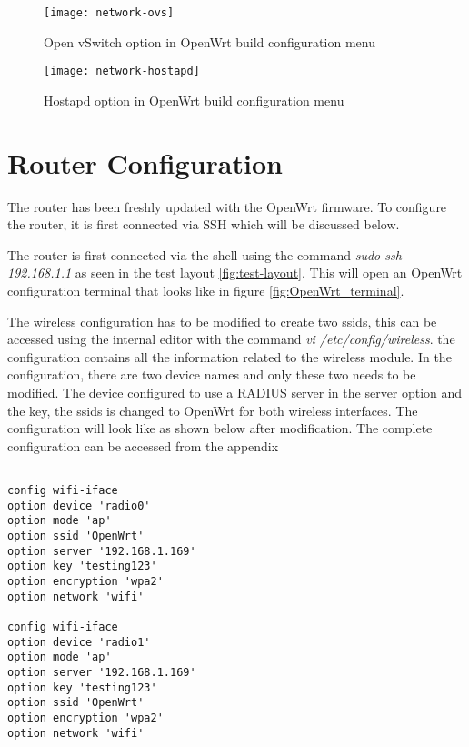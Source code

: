   \begin{figure}[H]
 	\centering
 	\texttt{[image: network-ovs]}
 	\caption {Open vSwitch option in OpenWrt build configuration menu}
 	\label{fig:openvswitch}
 	\vspace{-10pt}
 \end{figure}

 \begin{figure}[H]
	\centering
	\texttt{[image: network-hostapd]}
	\caption {Hostapd option in OpenWrt build configuration menu}
	\label{fig:hostapd}
	\vspace{-10pt}
\end{figure}
\section{Router Configuration}
The router has been freshly updated with the OpenWrt firmware. To configure the router, it is first connected via SSH which will be discussed below.

The router is first connected via the shell using the command \textit{sudo ssh 192.168.1.1} as seen in the test layout \ref{fig:test-layout}. This will open an OpenWrt configuration terminal that looks like in figure \ref{fig:OpenWrt_terminal}.

The wireless configuration has to be modified to create two ssids, this can be accessed using the internal editor with the command \textit{vi /etc/config/wireless}. the configuration contains all the information related to the wireless module. In the configuration, there are two device names and only these two needs to be modified. The device configured to use a RADIUS server in the server option and the key, the ssids is changed to OpenWrt for both wireless interfaces. The configuration will look like as shown below after modification. The complete configuration can be accessed from the appendix 

	\begin{lstlisting}

config wifi-iface
option device 'radio0'
option mode 'ap'
option ssid 'OpenWrt'
option server '192.168.1.169'
option key 'testing123'
option encryption 'wpa2'
option network 'wifi'

config wifi-iface
option device 'radio1'
option mode 'ap'
option server '192.168.1.169'
option key 'testing123'
option ssid 'OpenWrt'
option encryption 'wpa2'
option network 'wifi'
\end{lstlisting}


